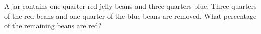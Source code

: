 A jar contains one-quarter red jelly beans and three-quarters blue. Three-quarters of the red beans and one-quarter of the blue beans are removed. What percentage of the remaining beans are red?
